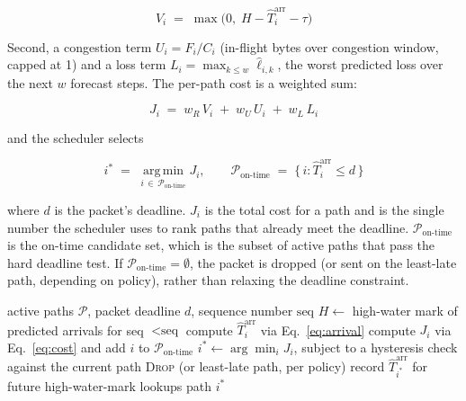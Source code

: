 \documentclass[sigconf,nonacm]{acmart}
\begin{document}
\begin{equation}
    V_i \;=\; \max\!\big(0,\; H - \hat{T}_i^{\text{arr}} - \tau \big)
\end{equation}

Second, a congestion term $U_i = F_i / C_i$ (in-flight bytes over congestion window, capped at 1) and a loss term $L_i = \max_{k \le w} \hat{\ell}_{i,k}$, the worst predicted loss over the next $w$ forecast steps. The per-path cost is a weighted sum:

\begin{equation}
    J_i \;=\; w_R\, V_i \;+\; w_U\, U_i \;+\; w_L\, L_i
    \label{eq:cost}
\end{equation}

and the scheduler selects

\begin{equation}
    i^{*} \;=\; \operatorname*{arg\,min}_{i \,\in\, \mathcal{P}_{\text{on-time}}} J_i,
    \qquad
    \mathcal{P}_{\text{on-time}} \;=\; \{\, i : \hat{T}_i^{\text{arr}} \le d \,\}
    \label{eq:decision}
\end{equation}

where $d$ is the packet's deadline. $J_i$ is the total cost for a path and is the single number the scheduler uses to rank paths that already meet the deadline. $\mathcal{P}_{\text{on-time}}$ is the on-time candidate set, which is the subset of active paths that pass the hard deadline test.
If $\mathcal{P}_{\text{on-time}} = \emptyset$, the packet is dropped (or sent on the least-late path, depending on policy), rather than relaxing the deadline constraint.

\begin{algorithm}[h]
\caption{QoE-Predictive path selection}
\label{alg:qoe}
\begin{algorithmic}[1]
\Require active paths $\mathcal{P}$, packet deadline $d$, sequence number $\text{seq}$
\State $H \gets$ high-water mark of predicted arrivals for seq $< \text{seq}$
    \State compute $\hat{T}_i^{\text{arr}}$ via Eq.~\eqref{eq:arrival}
        \State compute $J_i$ via Eq.~\eqref{eq:cost} and add $i$ to $\mathcal{P}_{\text{on-time}}$
    \EndIf
\EndFor
{}
    \State $i^{*} \gets \arg\min_i J_i$, subject to a hysteresis check against the current path
\Else
    \State \Return \textsc{Drop} (or least-late path, per policy)
\EndIf
\State record $\hat{T}_{i^{*}}^{\text{arr}}$ for future high-water-mark lookups
\State \Return path $i^{*}$
\end{algorithmic}
\end{algorithm}
\end{document}
